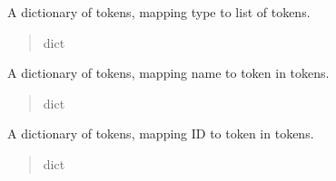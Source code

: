 \documentclass[letterpaper,10pt,english]{sphinxmanual}
\begin{document}
\begin{fulllineitems}
\begin{fulllineitems}
\label{\detokenize{nodes:nodes.nodeBuilder.Token_set.tokens}}
\pysigstartsignatures
\pysigline
{}
\pysigstopsignatures
\sphinxAtStartPar
A dictionary of tokens, mapping type to list of tokens.
\begin{quote}\begin{description}
\sphinxAtStartPar
dict

\end{description}\end{quote}

\end{fulllineitems}


\begin{fulllineitems}
\label{\detokenize{nodes:nodes.nodeBuilder.Token_set.name_dict}}
\pysigstartsignatures
\pysigline
{}
\pysigstopsignatures
\sphinxAtStartPar
A dictionary of tokens, mapping name to token in tokens.
\begin{quote}\begin{description}
\sphinxAtStartPar
dict

\end{description}\end{quote}

\end{fulllineitems}


\begin{fulllineitems}
\label{\detokenize{nodes:nodes.nodeBuilder.Token_set.id_dict}}
\pysigstartsignatures
\pysigline
{}
\pysigstopsignatures
\sphinxAtStartPar
A dictionary of tokens, mapping ID to token in tokens.
\begin{quote}\begin{description}
\sphinxAtStartPar
dict

\end{description}\end{quote}

\end{fulllineitems}


\end{fulllineitems}
\end{document}

